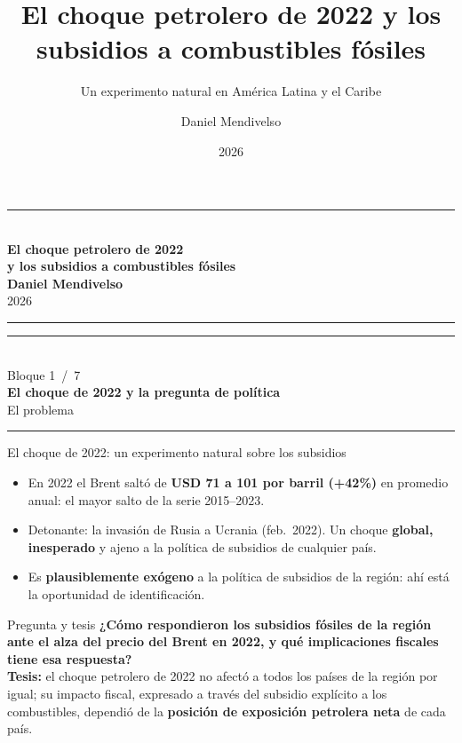 \documentclass[aspectratio=169,10pt]{beamer}
\title{El choque petrolero de 2022 y los subsidios a combustibles fósiles}
\subtitle{Un experimento natural en América Latina y el Caribe}
\author{Daniel Mendivelso}
\date{2026}
\newcommand{\key}[1]{{\bfseries\color{AcentoRojo}#1}}
\newcommand{\divisor}[3]{%
  {\setbeamertemplate{footline}{}%
   \begin{frame}[plain]
     \vfill
     \begin{center}
       {\color{AcentoRojo}\rule{2.6cm}{1.2pt}}\\[0.7em]
       {\scriptsize\color{GrisMedio}Bloque #1 \,/\, 7}\\[0.6em]
       {\Large\color{Carbon}\bfseries #2}\\[0.45em]
       {\color{GrisMedio}#3}\\[0.7em]
       {\color{AcentoRojo}\rule{2.6cm}{1.2pt}}
     \end{center}
     \vfill
   \end{frame}}}
\begin{document}
{
\begin{frame}[plain]
  \vfill
  \begin{center}
    {\color{AcentoRojo}\rule{3.5cm}{1.4pt}}\\[1.1em]
    {\color{Carbon}\bfseries El choque petrolero de 2022\\[0.2em]
     y los subsidios a combustibles fósiles}\\[2.4em]
    {\large\color{Carbon}\textbf{Daniel Mendivelso}}\\[0.4em]
    {\color{GrisMedio}2026}\\[1.1em]
    {\color{AcentoRojo}\rule{3.5cm}{1.4pt}}
  \end{center}
  \vfill
\end{frame}
}

\divisor{1}{El choque de 2022 y la pregunta de política}{El problema}

\begin{frame}{El choque de 2022: un experimento natural sobre los subsidios}
  \begin{itemize}
    \item En 2022 el Brent saltó de \key{USD 71 a 101 por barril (+42\%)} en promedio anual:
          el mayor salto de la serie 2015--2023.
    \item Detonante: la \alert{invasión de Rusia a Ucrania} (feb.\ 2022). Un choque
          \textbf{global, inesperado} y ajeno a la política de subsidios de cualquier país.
    \item Es \textbf{plausiblemente exógeno} a la política de subsidios de la región: ahí está
          la oportunidad de identificación.
  \end{itemize}

  \begin{block}{Pregunta y tesis}
    \textbf{¿Cómo respondieron los subsidios fósiles de la región ante el alza del precio del
    Brent en 2022, y qué implicaciones fiscales tiene esa respuesta?}\\[0.3em]
    \textbf{Tesis:} el choque petrolero de 2022 no afectó a todos los países de la región por igual;
    su impacto fiscal, expresado a través del subsidio explícito a los combustibles, dependió de la
    \textbf{posición de exposición petrolera neta} de cada país.
  \end{block}

\end{frame}
\end{document}
